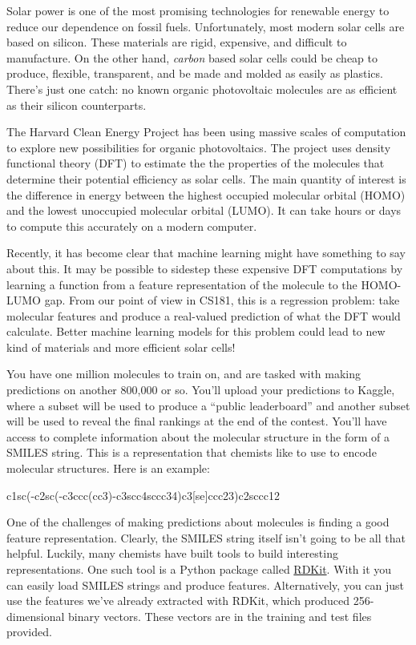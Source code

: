 \documentclass[12pt]{article}
\begin{document}
	Solar power is one of the most promising technologies for renewable energy to reduce our dependence on fossil fuels.  Unfortunately, most modern solar cells are based on silicon.  These materials are rigid, expensive, and difficult to manufacture.  On the other hand, \emph{carbon} based solar cells could be cheap to produce, flexible, transparent, and be made and molded as easily as plastics.  There's just one catch: no known organic photovoltaic molecules are as efficient as their silicon counterparts.
	
	The Harvard Clean Energy Project has been using massive scales of computation to explore new possibilities for organic photovoltaics.  The project uses density functional theory (DFT) to estimate the the properties of the molecules that determine their potential efficiency as solar cells.  The main quantity of interest is the difference in energy between the highest occupied molecular orbital (HOMO) and the lowest unoccupied molecular orbital (LUMO).  It can take hours or days to compute this accurately on a modern computer.
	
	Recently, it has become clear that machine learning might have something to say about this.  It may be possible to sidestep these expensive DFT computations by learning a function from a feature representation of the molecule to the HOMO-LUMO gap.  From our point of view in CS181, this is a regression problem: take molecular features and produce a real-valued prediction of what the DFT would calculate.  Better machine learning models for this problem could lead to new kind of materials and more efficient solar cells!
	
	You have one million molecules to train on, and are tasked with making predictions on another 800,000 or so.  You'll upload your predictions to Kaggle, where a subset will be used to produce a ``public leaderboard'' and another subset will be used to reveal the final rankings at the end of the contest.  You'll have access to complete information about the molecular structure in the form of a SMILES string.  This is a representation that chemists like to use to encode molecular structures.  Here is an example:
	\begin{center}
		c1sc(-c2sc(-c3ccc(cc3)-c3scc4sccc34)c3[se]ccc23)c2sccc12
	\end{center}

	One of the challenges of making predictions about molecules is finding a good feature representation.  Clearly, the SMILES string itself isn't going to be all that helpful.  Luckily, many chemists have built tools to build interesting representations.  One such tool is a Python package called \href{http://www.rdkit.org/}{RDKit}.  With it you can easily load SMILES strings and produce features. Alternatively, you can just use the features we've already extracted with RDKit, which produced 256-dimensional binary vectors.  These vectors are in the training and test files provided.
	
\end{document}
